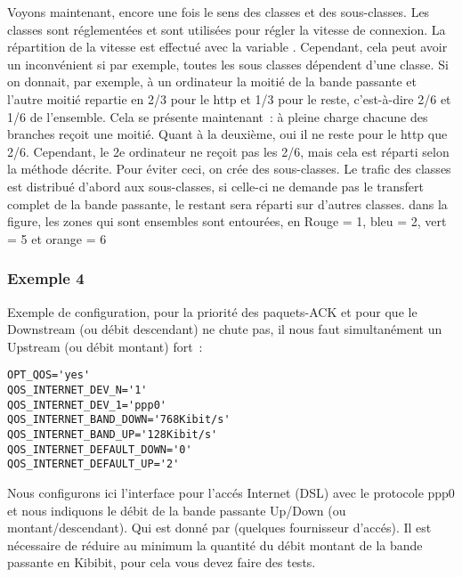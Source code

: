    Voyons maintenant, encore une fois le sens des classes et des sous-classes.
    Les classes sont réglementées et sont utilisées pour régler la vitesse
    de connexion. La répartition de la vitesse est effectué avec la variable
    . Cependant, cela peut avoir un
    inconvénient si par exemple, toutes les sous classes dépendent d'une
    classe. Si on donnait, par exemple, à un ordinateur la moitié de la
    bande passante et l'autre moitié repartie en 2/3 pour le http et 1/3 pour le
    reste, c'est-à-dire 2/6 et 1/6 de l'ensemble. Cela se présente maintenant~: à
    pleine charge chacune des branches reçoit une moitié. Quant à la deuxième,
    oui il ne reste pour le http que 2/6. Cependant, le 2e ordinateur ne reçoit
    pas les 2/6, mais cela est réparti selon la méthode décrite. Pour éviter ceci,
    on crée des sous-classes. Le trafic des classes est distribué d'abord aux
    sous-classes, si celle-ci ne demande pas le transfert complet de
    la bande passante, le restant sera réparti sur d'autres classes. dans la
    figure, les zones qui sont ensembles sont entourées, en Rouge = 1, bleu = 2,
    vert = 5 et orange = 6



\subsubsection{Exemple 4}



    Exemple de configuration, pour la priorité des paquets-ACK et pour que
    le Downstream (ou débit descendant) ne chute pas, il nous faut simultanément
    un Upstream (ou débit  montant) fort~:

\begin{small}
\begin{example}
\begin{verbatim}
OPT_QOS='yes'
QOS_INTERNET_DEV_N='1'
QOS_INTERNET_DEV_1='ppp0'
QOS_INTERNET_BAND_DOWN='768Kibit/s'
QOS_INTERNET_BAND_UP='128Kibit/s'
QOS_INTERNET_DEFAULT_DOWN='0'
QOS_INTERNET_DEFAULT_UP='2'

\end{verbatim}
\end{example}
\end{small}

    Nous configurons ici l'interface pour l'accés Internet (DSL) avec le
    protocole ppp0 et nous indiquons le débit de la bande passante Up/Down
    (ou montant/descendant). Qui est donné par (quelques fournisseur d'accés).
    Il est nécessaire de réduire au minimum la quantité du débit montant de
    la bande passante en Kibibit, pour cela vous devez faire des tests.

